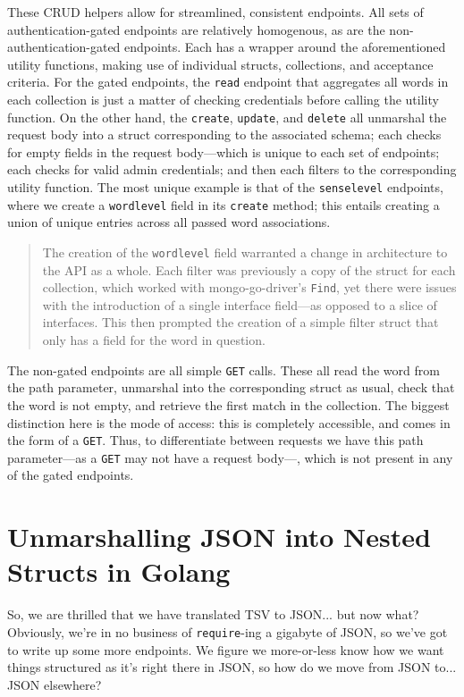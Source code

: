 \documentclass[11pt, twoside, reqno]{book}
\begin{document}
These CRUD helpers allow for streamlined, consistent endpoints. All sets of authentication-gated endpoints are relatively homogenous, as are the non-authentication-gated endpoints. Each has a wrapper around the aforementioned utility functions, making use of individual structs, collections, and acceptance criteria. For the gated endpoints, the \texttt{read} endpoint that aggregates all words in each collection is just a matter of checking credentials before calling the utility function. On the other hand, the \texttt{create}, \texttt{update}, and \texttt{delete} all unmarshal the request body into a struct corresponding to the associated schema; each checks for empty fields in the request body—which is unique to each set of endpoints; each checks for valid admin credentials; and then each filters to the corresponding utility function. The most unique example is that of the \texttt{senselevel} endpoints, where we create a \texttt{wordlevel} field in its \texttt{create} method; this entails creating a union of unique entries across all passed word associations.

\begin{quote}
The creation of the \texttt{wordlevel} field warranted a change in architecture to the API as a whole. Each filter was previously a copy of the struct for each collection, which worked with mongo-go-driver's \texttt{Find}, yet there were issues with the introduction of a single interface field—as opposed to a slice of interfaces. This then prompted the creation of a simple filter struct that only has a field for the word in question.
\end{quote}

The non-gated endpoints are all simple \texttt{GET} calls. These all read the word from the path parameter, unmarshal into the corresponding struct as usual, check that the word is not empty, and retrieve the first match in the collection. The biggest distinction here is the mode of access: this is completely accessible, and comes in the form of a \texttt{GET}. Thus, to differentiate between requests we have this path parameter—as a \texttt{GET} may not have a request body—, which is not present in any of the gated endpoints.

\section{Unmarshalling JSON into Nested Structs in Golang}

So, we are thrilled that we have translated TSV to JSON... but now what? Obviously, we're in no business of \texttt{require}-ing a gigabyte of JSON, so we've got to write up some more endpoints. We figure we more-or-less know how we want things structured as it's right there in JSON, so how do we move from JSON to... \textit{}JSON elsewhere\textit{}?
\end{document}
